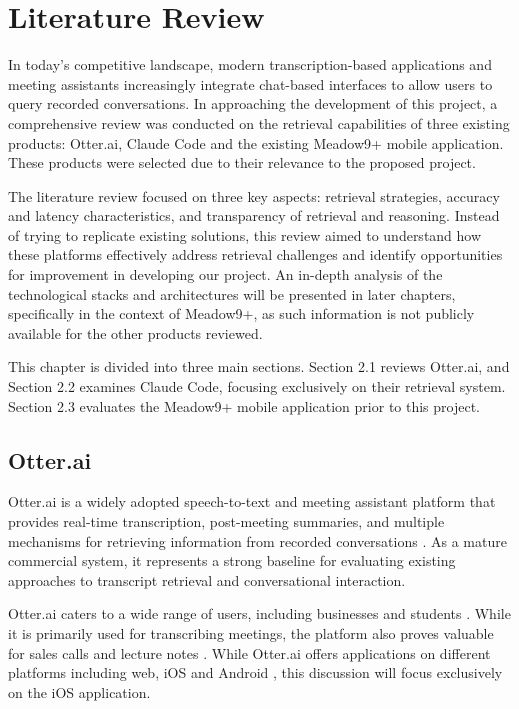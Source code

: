 \chapter{Literature Review}
In today’s competitive landscape, modern transcription-based applications and meeting assistants increasingly integrate chat-based interfaces to allow users to query recorded conversations. In approaching the development of this project, a comprehensive review was conducted on the retrieval capabilities of three existing products: Otter.ai, Claude Code and the existing Meadow9+ mobile application. These products were selected due to their relevance to the proposed project. 

The literature review focused on three key aspects: retrieval strategies, accuracy and latency characteristics, and transparency of retrieval and reasoning. Instead of trying to replicate existing solutions, this review aimed to understand how these platforms effectively address retrieval challenges and identify opportunities for improvement in developing our project. An in-depth analysis of the technological stacks and architectures will be presented in later chapters, specifically in the context of Meadow9+, as such information is not publicly available for the other products reviewed.

This chapter is divided into three main sections. Section 2.1 reviews Otter.ai, and Section 2.2 examines Claude Code, focusing exclusively on their retrieval system. Section 2.3 evaluates the Meadow9+ mobile application prior to this project. 

\section{Otter.ai}
Otter.ai is a widely adopted speech-to-text and meeting assistant platform that provides real-time transcription, post-meeting summaries, and multiple mechanisms for retrieving information from recorded conversations \cite{otter_appstore}. As a mature commercial system, it represents a strong baseline for evaluating existing approaches to transcript retrieval and conversational interaction. 

Otter.ai caters to a wide range of users, including businesses and students \cite{otter_sales_agent,otter_education_agent}. While it is primarily used for transcribing meetings, the platform also proves valuable for sales calls and lecture notes \cite{otter_sales_agent,otter_education_agent}. While Otter.ai offers applications on different platforms including web, iOS and Android \cite{otter_features}, this discussion will focus exclusively on the iOS application.

